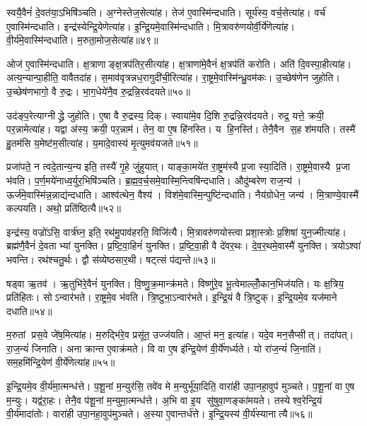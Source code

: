 स्वयै॒वैनं॑ दे॒वत॑या॒ऽभिषि॑ञ्चति।
अ॒ग्नेस्तेज॒सेत्या॑ह।
तेज॑ ए॒वास्मि॑न्दधाति।
सूर्य॑स्य॒ वर्च॒सेत्या॑ह।
वर्च॑ ए॒वास्मि॑न्दधाति।
इन्द्र॑स्येन्द्रि॒येणेत्या॑ह।
इ॒न्द्रि॒यमे॒वास्मि॑न्दधाति।
मि॒त्रावरु॑णयोर्वी॒र्ये॑णेत्या॑ह।
वी॒र्य॑मे॒वास्मि॑न्दधाति।
म॒रुता॒मोज॒सेत्या॑ह॥४९॥

ओज॑ ए॒वास्मि॑न्दधाति।
क्ष॒त्राणाङ्क्ष॒त्रप॑तिर॒सीत्या॑ह।
क्ष॒त्राणा॑मे॒वैनं॑ क्ष॒त्रप॑तिं करोति।
अति॑ दि॒वस्पा॒हीत्या॑ह।
अत्य॒न्यान्पा॒हीति॒ वावैतदा॑ह।
स॒माव॑वृत्रन्नध॒रागुदी॑ची॒रित्या॑ह।
रा॒ष्ट्रमे॒वास्मि॑न्ध्रु॒वम॑कः।
उ॒च्छेष॑णेन जुहोति।
उ॒च्छेष॑णभागो॒ वै रु॒द्रः।
भा॒ग॒धेये॑नै॒व रु॒द्रन्नि॒रव॑दयते॥५०॥

उद॑ङ्प॒रेत्याग्नीद्ध्रे जुहोति।
ए॒षा वै रु॒द्रस्य॒ दिक्।
स्वाया॑मे॒व दि॒शि रु॒द्रन्नि॒रव॑दयते।
रुद्र॒ यत्ते॒ क्रयी॒ पर॒न्नामेत्या॑ह।
यद्वा अ॑स्य॒ क्रयी॒ पर॒न्नाम॑।
तेन॒ वा ए॒ष हि॑नस्ति।
य हि॒नस्ति॑।
तेनै॒वैन स॒ह श॑मयति।
तस्मै॑ हु॒तम॑सि य॒मेष्ट॑म॒सीत्या॑ह।
य॒मादे॒वास्य॑ मृ॒त्युमव॑यजते॥५१॥

प्रजा॑पते॒ न त्वदे॒तान्य॒न्य इति॒ तस्यै॑ गृ॒हे जु॑हुयात्।
याङ्का॒मये॑त रा॒ष्ट्रम॑स्यै प्र॒जा स्या॒दिति॑।
रा॒ष्ट्रमे॒वास्यै प्र॒जा भ॑वति।
प॒र्ण॒मये॑नाध्व॒र्युर॒भिषि॑ञ्चति।
ब्र॒ह्म॒व॒र्च॒समे॒वास्मि॒न्त्विषि॑न्दधाति।
औदु॑म्बरेण राज॒न्य॑।
ऊर्ज॑मे॒वास्मि॑न्न॒न्नाद्य॑न्दधाति।
आश्व॑त्थेन॒ वैश्य॑।
विश॑मे॒वास्मि॒न्पुष्टि॑न्दधाति।
नैय॑ग्रोधेन॒ जन्य॑।
मि॒त्राण्ये॒वास्मै॑ कल्पयति।
अथो॒ प्रति॑ष्ठित्यै॥५२॥

इन्द्र॑स्य॒ वज्रो॑ऽसि॒ वार्त्र॑घ्न॒ इति॒ रथ॑मु॒पाव॑हरति॒ विजि॑त्यै।
मि॒त्रावरु॑णयोस्त्वा प्रशा॒स्त्रोः प्र॒शिषा॑ युन॒ज्मीत्या॑ह।
ब्रह्म॑णै॒वैनं॑ दे॒वताभ्यां युनक्ति।
प्र॒ष्टि॒वा॒हिनं॑ युनक्ति।
प्र॒ष्टि॒वा॒ही वै दे॑वर॒थः।
दे॒व॒र॒थमे॒वास्मै॑ युनक्ति।
त्रयोऽश्वा॑ भवन्ति।
रथ॑श्चतु॒र्थः।
द्वौ स॑व्येष्ठसार॒थी।
षट्त्सं प॑द्यन्ते॥५३॥

षड्वा ऋ॒तव॑।
ऋ॒तुभि॑रे॒वैनं॑ युनक्ति।
वि॒ष्णु॒क्र॒मान्क्र॑मते।
विष्णु॑रे॒व भू॒त्वेमाल्लोँ॒कान॒भिज॑यति।
यः क्ष॒त्रिय॒ प्रति॑हितः।
सोऽन्वार॑भते।
रा॒ष्ट्रमे॒व भ॑वति।
त्रि॒ष्टुभा॒ऽन्वार॑भते।
इ॒न्द्रि॒यं वै त्रि॒ष्टुक्।
इ॒न्द्रि॒यमे॒व यज॑माने दधाति॥५४॥

म॒रुतां प्रस॒वे जे॑ष॒मित्या॑ह।
म॒रुद्भि॑रे॒व प्रसू॑त॒ उज्ज॑यति।
आ॒प्तं मन॒ इत्या॑ह।
यदे॒व मन॒सैप्सीत्।
तदा॑पत्।
रा॒ज॒न्यं॑ जिनाति।
अनाक्रान्त ए॒वाक्र॑मते।
वि वा ए॒ष इ॑न्द्रि॒येण॑ वी॒र्ये॑णर्ध्यते।
यो रा॑ज॒न्यं॑ जि॒नाति॑।
सम॒हमि॑न्द्रि॒येण॑ वी॒र्ये॑णेत्या॑ह॥५५॥

इ॒न्द्रि॒यमे॒व वी॒र्य॑मा॒त्मन्ध॑त्ते।
प॒शू॒नां म॒न्युर॑सि॒ तवे॑व मे म॒न्युर्भू॑या॒दिति॒ वारा॑ही उपा॒नहा॒वुप॑ मुञ्चते।
प॒शू॒नां वा ए॒ष म॒न्युः।
यद्व॑रा॒हः।
तेनै॒व प॑शू॒नां म॒न्युमा॒त्मन्ध॑त्ते।
अ॒भि वा इ॒य सु॑षुवा॒णङ्का॑मयते।
तस्येश्व॒रेन्द्रि॒यं वी॒र्य॑मादा॑तोः।
वारा॑ही उपा॒नहा॒वुप॑मुञ्चते।
अ॒स्या ए॒वान्तर्ध॑त्ते।
इ॒न्द्रि॒यस्य॑ वी॒र्य॑स्यानात्यै॥५६॥

